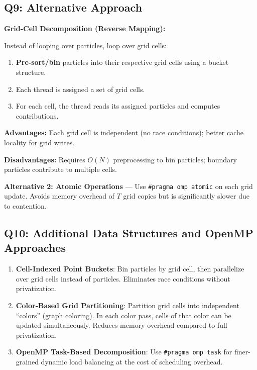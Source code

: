\documentclass[12pt,a4paper]{article}
\begin{document}
\subsection{Q9: Alternative Approach}

\textbf{Grid-Cell Decomposition (Reverse Mapping):}

Instead of looping over particles, loop over grid cells:
\begin{enumerate}
    \item \textbf{Pre-sort/bin} particles into their respective grid cells using a bucket structure.
    \item Each thread is assigned a set of grid cells.
    \item For each cell, the thread reads its assigned particles and computes contributions.
\end{enumerate}

\textbf{Advantages:} Each grid cell is independent (no race conditions); better cache locality for grid writes.

\textbf{Disadvantages:} Requires $O(N)$ preprocessing to bin particles; boundary particles contribute to multiple cells.

\textbf{Alternative 2: Atomic Operations} --- Use \texttt{\#pragma omp atomic} on each grid update. Avoids memory overhead of $T$ grid copies but is significantly slower due to contention.

\subsection{Q10: Additional Data Structures and OpenMP Approaches}

\begin{enumerate}
    \item \textbf{Cell-Indexed Point Buckets}: Bin particles by grid cell, then parallelize over grid cells instead of particles. Eliminates race conditions without privatization.
    
    \item \textbf{Color-Based Grid Partitioning}: Partition grid cells into independent ``colors'' (graph coloring). In each color pass, cells of that color can be updated simultaneously. Reduces memory overhead compared to full privatization.
    
    \item \textbf{OpenMP Task-Based Decomposition}: Use \texttt{\#pragma omp task} for finer-grained dynamic load balancing at the cost of scheduling overhead.
\end{enumerate}
\end{document}
